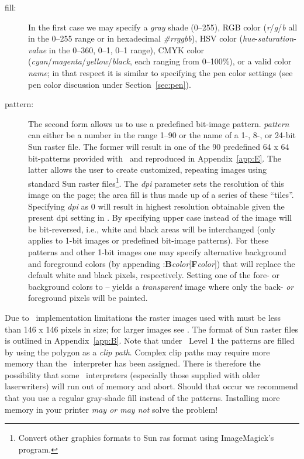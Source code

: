 \vspace{\baselineskip}
\noindent
\begin{description}
\item [fill:]
In the first case we may specify a \emph{gray} shade (0--255), RGB color
(\emph{r}/\emph{g}/\emph{b} all in the 0--255 range or in hexadecimal \emph{\#rrggbb}), HSV color (\emph{hue}-\emph{saturation}-\emph{value}
in the 0--360, 0--1, 0--1 range), CMYK color (\emph{cyan}/\emph{magenta}/\emph{yellow}/\emph{black},
each ranging from 0--100\%), or a valid color \emph{name}; in that respect it is similar
to specifying the pen color settings (see pen color discussion under Section~\ref{sec:pen}).
\item [pattern:]
The second form allows us to use a predefined bit-image pattern.
\emph{pattern} can either be a number in the range 1--90 or the name of a 1-,
8-, or 24-bit Sun raster file.  The former will result in one of the 90
predefined 64 x 64 bit-patterns provided with \GMT\ and reproduced in Appendix~\ref{app:E}.
The latter allows the user to create customized, repeating images using
standard Sun raster files\footnote{Convert other graphics formats to Sun ras format using
ImageMagick's  program.}.  The \emph{dpi} parameter sets the resolution of
this image on the page;  the area fill is thus made up of a series of these
``tiles''.  Specifying \emph{dpi} as 0 will result in highest resolution
obtainable given the present dpi setting in .
By specifying upper case  instead of  the image will be
bit-reversed, i.e., white and black areas will be interchanged (only applies
to 1-bit images or predefined bit-image patterns).  For these patterns and
other 1-bit images one may specify alternative background and foreground
colors (by appending :\textbf{B}\emph{color}[\textbf{F}\emph{color}]) that will
replace the default white and black pixels, respectively.  Setting one of the
fore- or background colors to -- yields a \emph{transparent} image where only the
back- \emph{or} foreground pixels will be painted.
\end{description}

Due to \PS\ implementation limitations the raster images used with
 must be less than 146 x 146 pixels in size; for larger images see
.  The format of Sun raster files is outlined in Appendix~\ref{app:B}.
Note that under \PS\ Level 1 the patterns are filled by using
the polygon as a \emph{clip path}.  Complex clip paths may require
more memory than the \PS\ interpreter has been assigned.
There is therefore the possibility that some \PS\ interpreters
(especially those supplied with older laserwriters) will run out of memory
and abort.  Should that occur we recommend that you use a regular gray-shade
fill instead of the patterns.  Installing more memory in your printer
\emph{may or may not} solve the problem!

